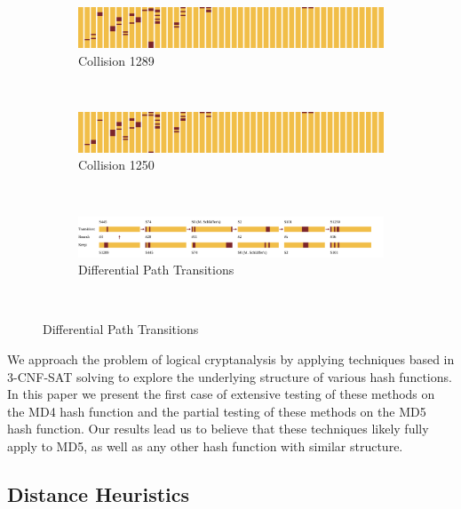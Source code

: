 \documentclass[conference]{IEEEtran}
\begin{document}
\begin{figure}
\begin{center}
  \begin{subfigure}{\textwidth}
    \includegraphics[width=\textwidth]{Figs/differential-1289.png}
    \caption{Collision 1289}
    \label{Fig:1289}
  \end{subfigure}\\
  \begin{subfigure}{\textwidth}
    \includegraphics[width=\textwidth]{Figs/differential-1250.png}
    \caption{Collision 1250}
    \label{Fig:1250}
  \end{subfigure}\\
  \begin{subfigure}{\textwidth}
    \includegraphics[width=\textwidth]{Figs/transitions.pdf}
    \caption{Differential Path Transitions}
    \label{Fig:Transitions}
  \end{subfigure}\\
\end{center}
\end{figure}

We approach the problem of logical cryptanalysis by applying
techniques based in 3-CNF-SAT solving to explore the underlying
structure of various hash functions.  In this paper we present the
first case of extensive testing of these methods on the MD4 hash
function and the partial testing of these methods on the MD5 hash
function.  Our results lead us to believe that these techniques likely
fully apply to MD5, as well as any other hash function with similar structure.


\subsection{Distance Heuristics}
\end{document}
